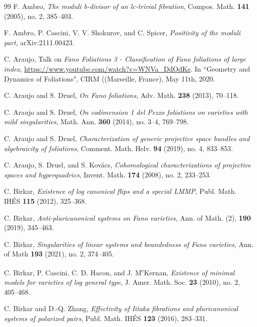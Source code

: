 \documentclass[12pt]{amsart}
\numberwithin{equation}{section}
\theoremstyle{definition}
\theoremstyle{definition}
\theoremstyle{definition}
\begin{document}
\begin{thebibliography}{99}
 F. Ambro, \textit{The moduli b-divisor of an lc-trivial fibration}, Compos. Math. \textbf{141} (2005), no. 2, 385--403.
 
 F. Ambro, P. Cascini, V. V. Shokurov, and C. Spicer, \textit{Positivity of the moduli part}, arXiv:2111.00423.

 C. Araujo, Talk on \textit{Fano Foliations 3 - Classification of Fano foliations of large index}, \url{https://www.youtube.com/watch?v=WNVa_DdOdKs}. In ``Geometry and Dynamics of Foliations", CIRM ((Marseille, France), May 11th, 2020.



 C. Araujo and S. Druel, \textit{On Fano foliations}, Adv. Math. \textbf{238} (2013), 70--118.

  C. Araujo and S. Druel, \textit{On codimension 1 del Pezzo foliations on varieties with
mild singularities}, Math. Ann. \textbf{360} (2014), no. 3--4, 769--798.

  C. Araujo and S. Druel, \textit{Characterization of generic projective space bundles and algebraicity of foliations},  Comment. Math. Helv. \textbf{94} (2019), no. 4, 833--853.

  C. Araujo, S. Druel, and S. Kovács, \textit{Cohomological characterizations of
projective spaces and hyperquadrics}, Invent. Math. \textbf{174} (2008), no. 2, 233--253.

 C. Birkar, \textit{Existence of log canonical flips and a special LMMP}, Publ. Math. IHÉS \textbf{115} (2012), 325--368.

 C. Birkar, \textit{Anti-pluricanonical systems on Fano varieties}, Ann. of Math. (2), \textbf{190} (2019), 345--463.
	

 C. Birkar, \textit{Singularities of linear systems and boundedness of Fano varieties}, Ann. of Math \textbf{193} (2021), no. 2, 374--405.


 C. Birkar, P. Cascini, C. D. Hacon, and J. M\textsuperscript{c}Kernan, \textit{Existence of minimal models for varieties of log general type}, J. Amer. Math. Soc. \textbf{23} (2010), no. 2, 405--468.


 C. Birkar and D.-Q. Zhang, \textit{Effectivity of Iitaka fibrations and pluricanonical systems of polarized pairs}, Publ. Math. IHÉS \textbf{123} (2016), 283--331.



\end{thebibliography}
\end{document}
